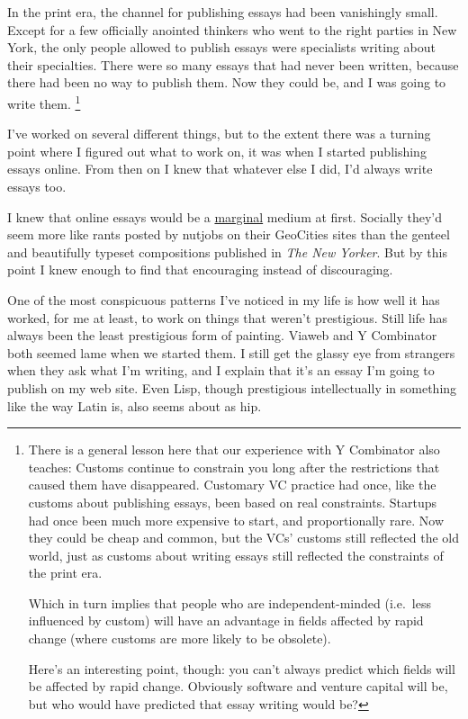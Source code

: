 In the print era, the channel for publishing essays had been vanishingly
small. Except for a few officially anointed thinkers who went to the
right parties in New York, the only people allowed to publish essays
were specialists writing about their specialties. There were so many
essays that had never been written, because there had been no way to
publish them. Now they could be, and I was going to write them.
\footnote{There is a general lesson here that our experience with Y
Combinator also teaches: Customs continue to constrain you long after
the restrictions that caused them have disappeared. Customary VC
practice had once, like the customs about publishing essays, been based
on real constraints. Startups had once been much more expensive to
start, and proportionally rare. Now they could be cheap and common, but
the VCs' customs still reflected the old world, just as customs about
writing essays still reflected the constraints of the print era.

Which in turn implies that people who are independent-minded (i.e.~less
influenced by custom) will have an advantage in fields affected by rapid
change (where customs are more likely to be obsolete).

Here's an interesting point, though: you can't always predict which
fields will be affected by rapid change. Obviously software and venture
capital will be, but who would have predicted that essay writing would
be?}

I've worked on several different things, but to the extent there was a
turning point where I figured out what to work on, it was when I started
publishing essays online. From then on I knew that whatever else I did,
I'd always write essays too.

I knew that online essays would be a \href{marginal.html}{marginal}
medium at first. Socially they'd seem more like rants posted by nutjobs
on their GeoCities sites than the genteel and beautifully typeset
compositions published in \emph{The New Yorker}. But by this point I
knew enough to find that encouraging instead of discouraging.

One of the most conspicuous patterns I've noticed in my life is how well
it has worked, for me at least, to work on things that weren't
prestigious. Still life has always been the least prestigious form of
painting. Viaweb and Y Combinator both seemed lame when we started them.
I still get the glassy eye from strangers when they ask what I'm
writing, and I explain that it's an essay I'm going to publish on my web
site. Even Lisp, though prestigious intellectually in something like the
way Latin is, also seems about as hip.

